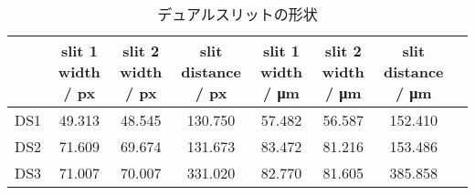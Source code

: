 \begin{table}[!htp]\centering
	\caption{デュアルスリットの形状}\label{tab:ds_slits}
	\scriptsize
	\begin{tabular}{cccccccc}\toprule
		    & slit 1 width / px & slit 2 width / px & slit distance / px & slit 1 width / \si{\micro\meter} & slit 2 width / \si{\micro\meter} & slit distance / \si{\micro\meter} \\\midrule
		DS1 & 49.313            & 48.545            & 130.750            & 57.482                           & 56.587                           & 152.410                           \\
		DS2 & 71.609            & 69.674            & 131.673            & 83.472                           & 81.216                           & 153.486                           \\
		DS3 & 71.007            & 70.007            & 331.020            & 82.770                           & 81.605                           & 385.858                           \\
		\bottomrule
	\end{tabular}
\end{table}

